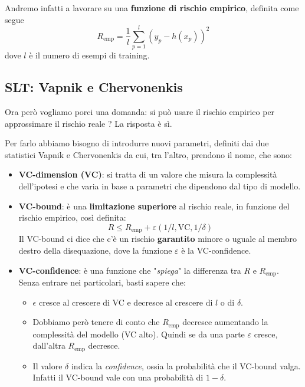 Andremo infatti a lavorare su una \textbf{funzione di rischio empirico}, definita come segue
\[ R_{\text{emp}} = \frac{1}{l} \sum_{p=1}^l (y_p - h(x_p))^2 \]
dove $l$ \`e il numero di esempi di training.

\subsection{SLT: Vapnik e Chervonenkis}
Ora per\`o vogliamo porci una domanda: si pu\`o usare il rischio empirico per approssimare il rischio reale ? La risposta
\`e s\`i.

Per farlo abbiamo bisogno di introdurre nuovi parametri, definiti dai due statistici Vapnik e Chervonenkis da cui, tra
l'altro, prendono il nome, che sono:
\begin{itemize}
	\item \textbf{VC-dimension (VC)}: si tratta di un valore che misura la complessit\`a dell'ipotesi e che varia in base a
	      parametri che dipendono dal tipo di modello.
	\item \textbf{VC-bound}: \`e una \textbf{limitazione superiore} al rischio reale, in funzione del rischio empirico,
	      cos\`i definita:
	      \[ R \leq R_{\text{emp}} + \varepsilon (1 / l, \text{VC}, 1 / \delta) \]
	      Il VC-bound ci dice che c'\`e un rischio \textbf{garantito} minore o uguale al membro destro della disequazione,
	      dove la funzione $\varepsilon$ \`e la VC-confidence.
	\item \textbf{VC-confidence}: \`e una funzione che "\emph{spiega}" la differenza tra $R$ e $R_\text{emp}$.
	      Senza entrare nei particolari, basti sapere che:
	      \begin{itemize}
		      \item $\epsilon$ cresce al crescere di VC e decresce al crescere di $l$ o di $\delta$.
		      \item Dobbiamo per\`o tenere di conto che $R_\text{emp}$ decresce aumentando la complessit\`a del modello
		            (VC alto). Quindi se da una parte $\varepsilon$ cresce, dall'altra $R_\text{emp}$ decresce.
		      \item Il valore $\delta$ indica la \emph{confidence}, ossia la probabilit\`a che il VC-bound valga. Infatti
		            il VC-bound vale con una probabilit\`a di $1 - \delta$.
	      \end{itemize}
\end{itemize}

